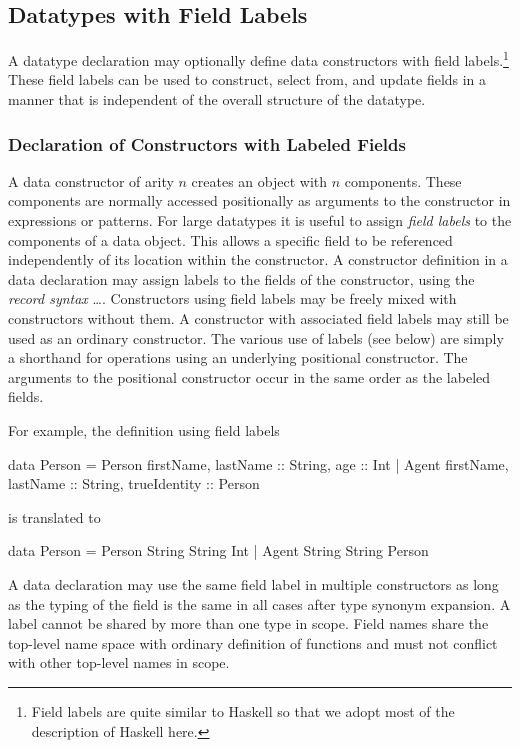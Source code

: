 \subsection {Datatypes with Field Labels}\label{flab}

A datatype declaration may optionally define data constructors
with field labels.\footnote{Field labels are quite similar
to Haskell \cite{PeytonJones03Haskell} so that we adopt most of
the description of Haskell here.}
These field labels can be used to
construct, select from, and update fields in a manner that is
independent of the overall structure of the datatype.

\subsubsection{Declaration of Constructors with Labeled Fields}

A data constructor of arity $n$ creates an object with $n$ components.
These components are normally accessed positionally as arguments to
the constructor in expressions or patterns.  For large datatypes it is
useful to assign \emph{field labels}
to the components of a data
object. This allows a specific field to be referenced independently of
its location within the constructor.  A constructor definition in a
data declaration may assign labels to the fields of the constructor,
using the \emph{record syntax}\pindex{\{\ldots{}\}}
\ldots\code{\}}.
Constructors using field labels
may be freely mixed with constructors without them. A constructor with
associated field labels may still be used as an ordinary constructor.
The various use of labels (see below)
are simply a shorthand for operations using an
underlying positional constructor. The arguments to the positional
constructor occur in the same order as the labeled fields.

\newcommand{\trans}[1]{$[\![$#1$]\!]$}

\translation{\\
\trans{$C$ \{ $lts$ \}} $=$ $C$ \trans{$lts$}\\
\trans{$lt$, $lts$} $=$ \trans{$lt$} \trans{$lts$}\\
\trans{$l$, $ls$\,::\,$t$} $=$ $t$ \trans{$ls$\,::\,$t$}\\
\trans{$l$\,::\,$t$} $=$ $t$
}

\noindent
For example, the definition using field labels
\begin{curry}
data Person = Person { firstName, lastName :: String, age :: Int }
            | Agent  { firstName, lastName :: String, trueIdentity :: Person }
\end{curry}
is translated to
\begin{curry}
data Person = Person String String Int
            | Agent  String String Person
\end{curry}
%
A data declaration may use the same field label in multiple
constructors as long as the typing of the field is the same in all
cases after type synonym expansion. A label cannot be shared by more
than one type in scope. Field names share the top-level name space with
ordinary definition of functions %
and must not conflict with other top-level names in scope.


